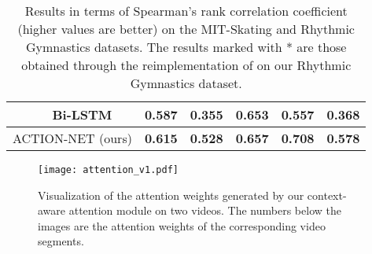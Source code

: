 \documentclass[sigconf]{acmart}
\begin{document}
\begin{table}[]
{\begin{tabular}{|l|c|ccccc|}
                        					& Bi-LSTM   	  & 0.587 & 0.355 & 0.653 & 0.557 & 0.368 \\ \hline
\multicolumn{2}{|c|}{ACTION-NET (ours)}          & \textbf{0.615} & \textbf{0.528} & \textbf{0.657} & \textbf{0.708} & \textbf{0.578} \\ \hline
\end{tabular}}
\vspace{0.2cm}
\caption{Results in terms of Spearman's rank correlation coefficient (higher values are better) on the MIT-Skating and Rhythmic Gymnastics datasets.  The results marked with * are those obtained through the reimplementation of \cite{parmar2017learning,xu2019learning} on our Rhythmic Gymnastics dataset. }
\label{Results}
\vspace{-0.6cm}
\end{table}

\begin{table}[]
\vspace{0.2cm}
\caption{Ablation study showing the contributions of the dynamic and static streams in our method. 
}
\label{tab:ablation study 1}

\vspace{-0.65cm}
\end{table}



\begin{figure*}[htb]
 \centering
 \texttt{[image: attention\_v1.pdf]}
 \vspace{-0.3cm}
\caption{Visualization of the attention weights generated by our context-aware attention module on two videos. The numbers below the images are the attention weights of the corresponding video segments. 
}
 \label{fig:attention}
\vspace{-0.3cm}
\end{figure*}
\end{document}
